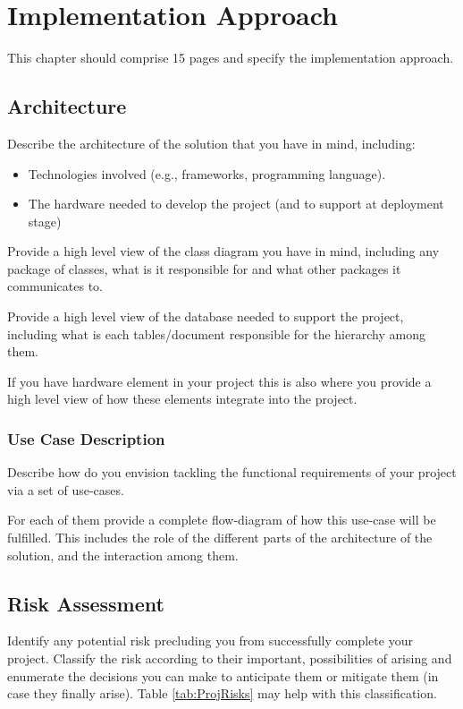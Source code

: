 \chapter{Implementation Approach}
This chapter should comprise 15 pages and specify the implementation approach.

\section{Architecture}
Describe the architecture of the solution that you have in mind, including:
\begin{itemize}
    \item Technologies involved (e.g., frameworks, programming language). 
    \item The hardware needed to develop the project (and to support at deployment stage)
\end{itemize}
  
Provide a high level view of the class diagram you have in mind, including any package of classes, what is it responsible for and what other packages it communicates to.  

Provide a high level view of the database needed to support the project, including what is each tables/document responsible for the hierarchy among them.  

If you have hardware element in your project this is also where you provide a high level view of how these elements integrate into the project.

\subsection{Use Case Description}
Describe how do you envision tackling the functional requirements of your project via a set of use-cases. 

For each of them provide a complete flow-diagram of how this use-case will be fulfilled. This includes the role of the different parts of the architecture of the solution, and the interaction among them.

\section{Risk Assessment}
Identify any potential risk precluding you from successfully complete your project. Classify the risk according to their important, possibilities of arising and enumerate the decisions you can make to anticipate them or mitigate them (in case they finally arise). Table \ref{tab:ProjRisks} may help with this classification.

